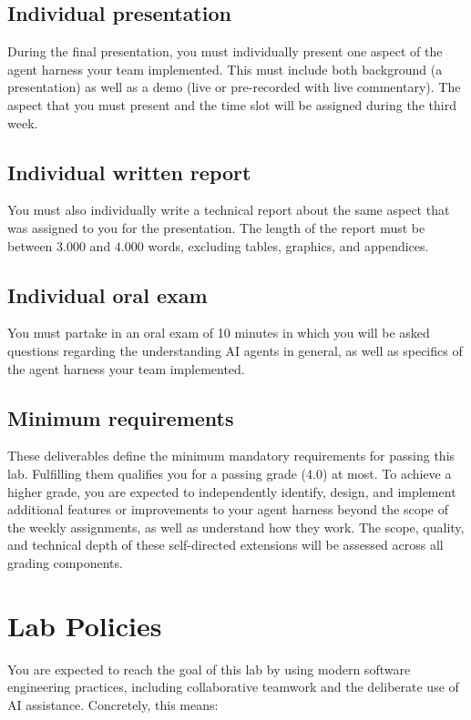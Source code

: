 \documentclass{article}
\begin{document}
\subsection{Individual presentation}

During the final presentation, you must individually present one aspect of the agent harness your team implemented. This must include both background (a presentation) as well as a demo (live or pre-recorded with live commentary). The aspect that you must present and the time slot will be assigned during the third week.

\subsection{Individual written report}

You must also individually write a technical report about the same aspect that was assigned to you for the presentation. The length of the report must be between $3.000$ and $4.000$ words, excluding tables, graphics, and appendices.

\subsection{Individual oral exam}

You must partake in an oral exam of 10 minutes in which you will be asked questions regarding the understanding AI agents in general, as well as specifics of the agent harness your team implemented.

\subsection*{Minimum requirements}

These deliverables define the minimum mandatory requirements for passing this lab. Fulfilling them qualifies you for a passing grade (4.0) at most. To achieve a higher grade, you are expected to independently identify, design, and implement additional features or improvements to your agent harness beyond the scope of the weekly assignments, as well as understand how they work. The scope, quality, and technical depth of these self-directed extensions will be assessed across all grading components.

\section{Lab Policies}

You are expected to reach the goal of this lab by using modern software engineering practices, including collaborative teamwork and the deliberate use of AI assistance. Concretely, this means:
\end{document}
